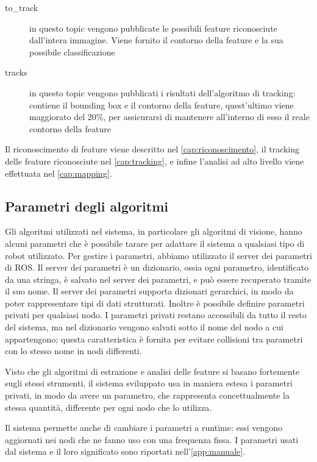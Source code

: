 \begin{description}
 \item [\/to\_track] in questo topic vengono pubblicate le possibili feature riconosciute dall'intera immagine. Viene fornito il contorno della feature e la sua possibile classificazione
 \item [\/tracks] in questo topic vengono pubblicati i risultati dell'algoritmo di tracking: contiene il bounding box e il contorno della feature, quest'ultimo viene maggiorato del 20\%, per assicurarsi di mantenere all'interno di esso il reale contorno della feature
\end{description}

Il riconoscimento di feature viene descritto nel \autoref{cap:riconoscimento}, il tracking delle feature riconosciute nel \autoref{cap:tracking}, e infine l'analisi ad alto livello viene effettuata nel \autoref{cap:mapping}.

\subsection{Parametri degli algoritmi}

Gli algoritmi utilizzati nel sistema, in particolare gli algoritmi di visione, hanno alcuni parametri che è possibile tarare per adattare il sistema a qualsiasi tipo di robot utilizzato.
Per gestire i parametri, abbiamo utilizzato il server dei parametri di ROS.
Il server dei parametri è un dizionario, ossia ogni parametro, identificato da una stringa, è salvato nel server dei parametri, e può essere recuperato tramite il suo nome. 
Il server dei parametri supporta dizionari gerarchici, in modo da poter rappresentare tipi di dati strutturati. 
Inoltre è possibile definire parametri privati per qualsiasi nodo. I parametri privati restano accessibili da tutto il resto del sistema, ma nel dizionario vengono salvati sotto il nome del nodo a cui appartengono; questa caratteristica è fornita per evitare collisioni tra parametri con lo stesso nome in nodi differenti.

Visto che gli algoritmi di estrazione e analisi delle feature si basano fortemente sugli stessi strumenti, il sistema sviluppato usa in maniera estesa i parametri privati, in modo da avere un parametro, che rappresenta concettualmente la stessa quantità, differente per ogni nodo che lo utilizza.

Il sistema permette anche di cambiare i parametri a runtime: essi vengono aggiornati nei nodi che ne fanno uso con una frequenza fissa.
I parametri usati dal sistema e il loro significato sono riportati nell'\autoref{app:manuale}.
